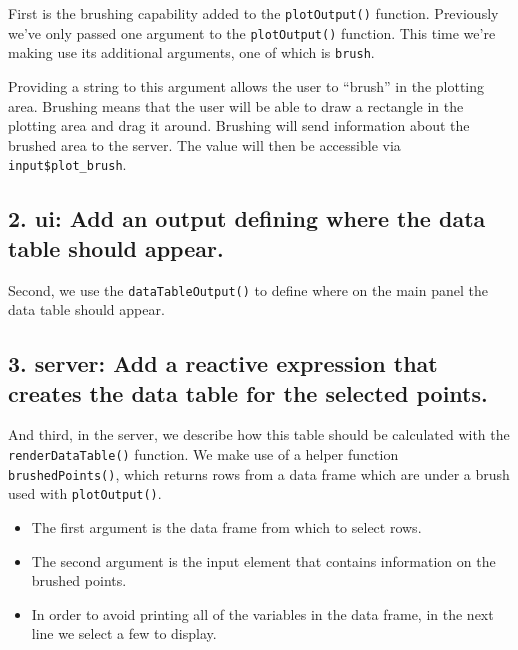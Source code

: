 \documentclass[
  letterpaper,
  DIV=11,
  numbers=noendperiod]{scrreprt}
\providecommand{\tightlist}{%
  \setlength{\itemsep}{0pt}\setlength{\parskip}{0pt}}
\begin{document}
First is the brushing capability added to the \texttt{plotOutput()}
function. Previously we've only passed one argument to the
\texttt{plotOutput()} function. This time we're making use its
additional arguments, one of which is \texttt{brush}.

Providing a string to this argument allows the user to ``brush'' in the
plotting area. Brushing means that the user will be able to draw a
rectangle in the plotting area and drag it around. Brushing will send
information about the brushed area to the server. The value will then be
accessible via \texttt{input\$plot\_brush}.

\hypertarget{ui-add-an-output-defining-where-the-data-table-should-appear.}{%
\subsection{\texorpdfstring{2. \textbf{ui:} Add an output defining where
the data table should
appear.}{2. ui: Add an output defining where the data table should appear.}}\label{ui-add-an-output-defining-where-the-data-table-should-appear.}}

Second, we use the \texttt{dataTableOutput()} to define where on the
main panel the data table should appear.

\hypertarget{server-add-a-reactive-expression-that-creates-the-data-table-for-the-selected-points.}{%
\subsection{\texorpdfstring{3. \textbf{server:} Add a reactive
expression that creates the data table for the selected
points.}{3. server: Add a reactive expression that creates the data table for the selected points.}}\label{server-add-a-reactive-expression-that-creates-the-data-table-for-the-selected-points.}}

And third, in the server, we describe how this table should be
calculated with the \texttt{renderDataTable()} function. We make use of
a helper function \texttt{brushedPoints()}, which returns rows from a
data frame which are under a brush used with \texttt{plotOutput()}.

\begin{itemize}
\tightlist
\item
  The first argument is the data frame from which to select rows.
\item
  The second argument is the input element that contains information on
  the brushed points.
\item
  In order to avoid printing all of the variables in the data frame, in
  the next line we select a few to display.
\end{itemize}
\end{document}
